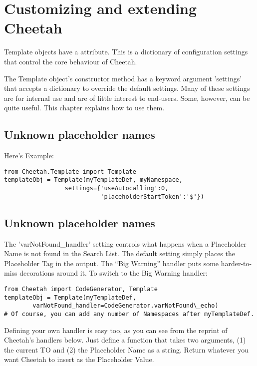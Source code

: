 \section{Customizing and extending Cheetah}
\label{customizing}

Template objects have a  attribute. This is a dictionary of
configuration settings that control the core behaviour of Cheetah.  

The Template object's constructor method has a keyword argument 'settings' that
accepts a dictionary to override the default settings.  Many of these settings
are for internal use and are of little interest to end-users.  Some, however,
can be quite useful. This chapter explains how to use them.

\subsection{Unknown placeholder names}

Here's 
Example:

\begin{verbatim}
from Cheetah.Template import Template
templateObj = Template(myTemplateDef, myNamespace, 
                 settings={'useAutocalling':0,
                           'placeholderStartToken':'$'})
\end{verbatim}


\subsection{Unknown placeholder names}

The 'varNotFound\_handler' setting controls what happens when a Placeholder
Name is not found in the Search List.  The default setting simply places the
Placeholder Tag in the output.  The ``Big Warning'' handler puts some
harder-to-miss decorations around it.  To switch to the Big Warning handler:

\begin{verbatim}
from Cheetah import CodeGenerator, Template
templateObj = Template(myTemplateDef, 
        varNotFound_handler=CodeGenerator.varNotFound\_echo)
# Of course, you can add any number of Namespaces after myTemplateDef.
\end{verbatim}

Defining your own handler is easy too, as you can see from the reprint of
Cheetah's handlers below.  Just define a function that takes two arguments, 
(1) the current TO and (2) the Placeholder Name as a string.  Return whatever
you want Cheetah to insert as the Placeholder Value.

